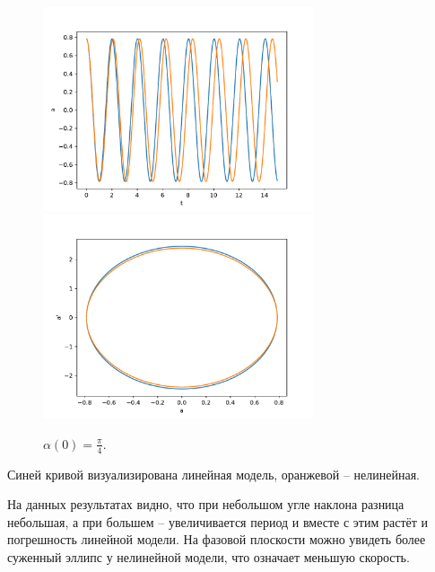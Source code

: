             \begin{figure}[H]
                \centering
                \includegraphics[width=8cm]{pictures/12resonance4.pdf}
                \includegraphics[width=8cm]{pictures/12resonance4p.pdf}
                \caption{$\alpha(0) = \frac{\pi}{4}$.}
            \end{figure}

            Синей кривой визуализирована линейная модель, оранжевой -- нелинейная.
            
            На данных результатах видно, что при небольшом угле наклона разница небольшая, а при большем -- увеличивается период и вместе с этим растёт и погрешность линейной модели. На фазовой плоскости можно увидеть более суженный эллипс у нелинейной модели, что означает меньшую скорость.

